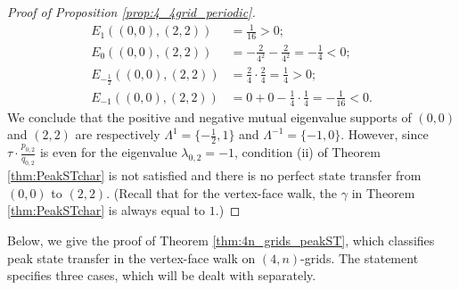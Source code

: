 \documentclass{article}
\numberwithin{equation}{section}
\begin{document}
\begin{proof}[Proof of Proposition \ref{prop:4_4grid_periodic}]
\[
\begin{split}
E_1((0,0),(2,2)) &= \frac{1}{16} > 0; \\
E_0((0,0),(2,2)) &= -\frac{2}{4^2} - \frac{2}{4^2} = -\frac{1}{4} < 0; \\
E_{-\frac{1}{2}}((0,0),(2,2)) &= \frac{2}{4}\cdot \frac{2}{4} = \frac{1}{4} > 0; \\
E_{-1}((0,0),(2,2)) &= 0 + 0 - \frac{1}{4}\cdot \frac{1}{4} = -\frac{1}{16} < 0.
\end{split}
\]
We conclude that the positive and negative mutual eigenvalue supports of $(0,0)$ and $(2,2)$ are respectively $\Lambda^{1} = \{-\frac{1}{2},1\}$ and $\Lambda^{-1} = \{-1,0\}$. However, since $\tau \cdot \frac{p_{0,2}}{q_{0,2}}$ is even for the eigenvalue $\lambda_{0,2} = -1$, condition (ii) of Theorem \ref{thm:PeakSTchar} is not satisfied and there is no perfect state transfer from $(0,0)$ to $(2,2)$. (Recall that for the vertex-face walk, the $\gamma$ in Theorem \ref{thm:PeakSTchar} is always equal to $1$.)
\end{proof}




Below, we give the proof of Theorem \ref{thm:4n_grids_peakST}, which classifies peak state transfer in the vertex-face walk on $(4,n)$-grids. The statement specifies three cases, which will be dealt with separately.
\end{document}
